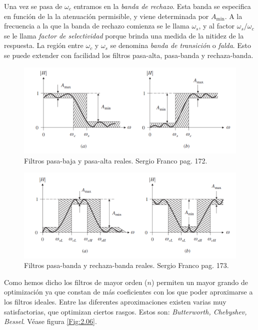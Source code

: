 \documentclass[11pt]{article} %
\begin{document}
Una vez se pasa de $\omega_c$ entramos en la \textit{banda de rechazo}. Esta banda se especifica en función de la la atenuación permisible, y viene determinada por $A_{\min}$. A la frecuencia a la que la banda de rechazo comienza se le llama $\omega_s$, y al factor $\omega_s / \omega_c$ se le llama \textit{factor de selectividad} porque brinda una medida de la nitidez de la respuesta. La región entre $\omega_c$ y $\omega_s$ se denomina \textit{banda de transición} o \textit{falda}. Esto se puede extender con facilidad los filtros pasa-alta, pasa-banda y rechaza-banda. \\


\begin{figure}[h!] \centering
\includegraphics[scale=0.9]{2.2-Reales1.png}
\caption{Filtros pasa-baja y pasa-alta reales. Sergio Franco pag. 172.}
\label{Fig:2.04}
\end{figure}

\begin{figure}[h!] \centering
\includegraphics[scale=0.9]{2.2-Reales2.png}
\caption{Filtros pasa-banda y rechaza-banda reales. Sergio Franco pag. 173.}
\label{Fig:2.05}
\end{figure}


Como hemos dicho los filtros de mayor orden ($n$) permiten un mayor grando de optimización ya que constan de más coeficientes con los que poder aproximarse a los filtros ideales. Entre las diferentes aproximaciones existen varias muy satisfactorias, que optimizan ciertos rasgos. Estos son: \textit{Butterworth, Chebyshev, Bessel}. Véase figura \ref{Fig:2.06}. \\
\end{document}
